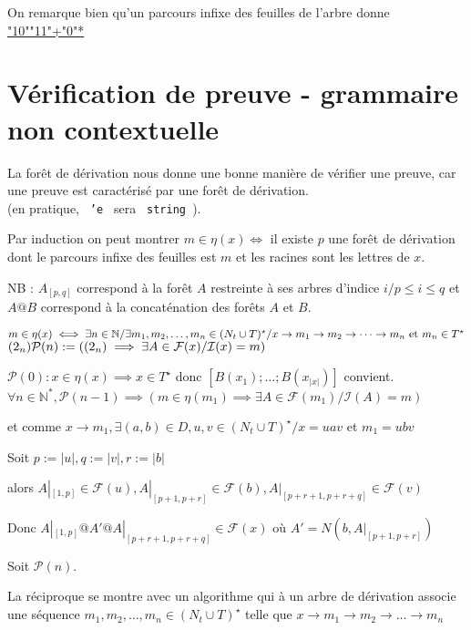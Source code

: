 \documentclass[a4paper,12pt]{article}
\newcommand{\norm}[1]{\lvert #1 \rvert}
\newlength{\mydepth}
\newlength{\myheight}
\newenvironment{answer}
{\par\begin{lrbox}{\mybox}\quad\begin{minipage}{\linewidth}\color{black}\setlength{\parskip}{10pt plus 1pt minus 1pt}\vspace*{-.7\baselineskip}}
{\end{minipage}\end{lrbox}
\settodepth{\mydepth}{\usebox{\mybox}}
\settoheight{\myheight}{\usebox{\mybox}}
\addtolength{\myheight}{\mydepth}
\noindent\makebox[0pt]{
  \color{gray}\hspace{-0pt}\rule[-\mydepth]{1pt}{\myheight}}
  \usebox{\mybox}
  }
\begin{document}
On remarque bien qu'un parcours infixe des feuilles de l'arbre donne \underline{ "10""11"+"0"* }

\section{Vérification de preuve - grammaire non contextuelle}

La forêt de dérivation nous donne une bonne manière de vérifier une preuve, car une preuve est caractérisé par une forêt de dérivation.\\

(en pratique, \texttt{ 'e } sera \texttt{ string }).

Par induction on peut montrer $m \in \eta(x) \iff $ il existe $p$ une forêt de dérivation dont le parcours infixe des feuilles est $m$ et les racines sont les lettres de $x$.

{\color{gray} NB : $A_{[p,q]}$ correspond à la forêt $A$ restreinte à ses arbres d'indice $i / p\leq i \leq q$ et $A@B$ correspond à la concaténation des forêts $A$ et $B$. }\\

\begin{answer} 
$
m \in \eta(x)\\
\iff \exists n \in \mathbb{N} / \exists m_1,m_2,\dots,m_n \in (N_t \cup T)^\star / x \rightarrow m_1 \rightarrow m_2 \rightarrow \dots \rightarrow m_n\text{ et }m_n \in T^\star$    $ (2_n)\\
\mathcal{P}(n) := ((2_n) \implies \exists A \in \mathcal{F}(x) / \mathcal{I}(x) = m)$\\
\begin{answer} 
$\mathcal{P}(0) : x \in \eta(x) \implies x \in T^\star$ donc $[B (x_1);\dots;B (x_{\norm{x}})]$ convient.\\
$\forall n \in \mathbb{N}^*,\mathcal{P}(n-1) \implies (m \in \eta(m_1) \implies \exists A \in \mathcal{F}(m_1)/ \mathcal{I}(A) = m)$

 et comme $x\rightarrow m_1,\exists (a,b) \in D, u,v\in (N_t\cup T)^\star /x = uav$ et $m_1 = ubv$

 Soit $p := \norm{u}, q := \norm{v}, r := \norm{b}$
 
 alors $A|_{[1,p]} \in \mathcal{F}(u), A|_{[p+1,p+r]} \in \mathcal{F}(b), A|_{[p+r+1,p+r+q]} \in \mathcal{F}(v)$

 Donc $A|_{[1,p]}@A'@A|_{[p+r+1,p+r+q]}\in \mathcal{F}(x)$ où $A' = N (b,A|_{[p+1,p+r]})$

 Soit $\mathcal{P}(n)$.
\end{answer}
\end{answer}
La réciproque se montre avec un algorithme qui à un arbre de dérivation associe une séquence $m_1,m_2,\dots,m_n \in (N_t \cup T)^\star$ telle que $x \rightarrow m_1 \rightarrow m_2 \rightarrow \dots \rightarrow m_n$
\end{document}
